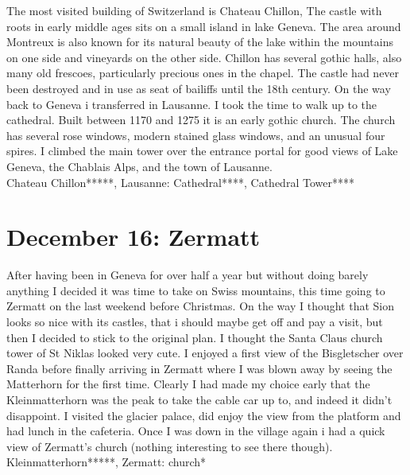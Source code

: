 The most visited building of Switzerland is Chateau Chillon, The castle with roots in early middle ages sits on a small island in lake Geneva. The area around Montreux is also known for its natural beauty of the lake within the mountains on one side and vineyards on the other side. Chillon has several gothic halls, also many old frescoes, particularly precious ones in the chapel. The castle had never been destroyed and in use as seat of bailiffs until the 18th century. On the way back to Geneva i transferred in Lausanne. I took the time to walk up to the cathedral. Built between 1170 and 1275 it is an early gothic church. The church has several rose windows, modern stained glass windows, and an unusual four spires. I climbed the main tower over the entrance portal for good views of Lake Geneva, the Chablais Alps, and the town of Lausanne.\\

Chateau Chillon*****, Lausanne: Cathedral****, Cathedral Tower****

\section{December 16: Zermatt}
\label{2007:Zermatt}

After having been in Geneva for over half a year but without doing barely anything I decided it was time to take on Swiss mountains, this time going to Zermatt on the last weekend before Christmas. On the way I thought that Sion looks so nice with its castles, that i should maybe get off and pay a visit, but then I decided to stick to the original plan. I thought the Santa Claus church tower of St Niklas looked very cute. I enjoyed a first view of the Bisgletscher over Randa before finally arriving in Zermatt where I was blown away by seeing the Matterhorn for the first time. Clearly I had made my choice early that the Kleinmatterhorn was the peak to take the cable car up to, and indeed it didn't disappoint. I visited the glacier palace, did enjoy the view from the platform and had lunch in the cafeteria. Once I was down in the village again i had a quick view of Zermatt's church (nothing interesting to see there though).\\

Kleinmatterhorn*****, Zermatt: church*